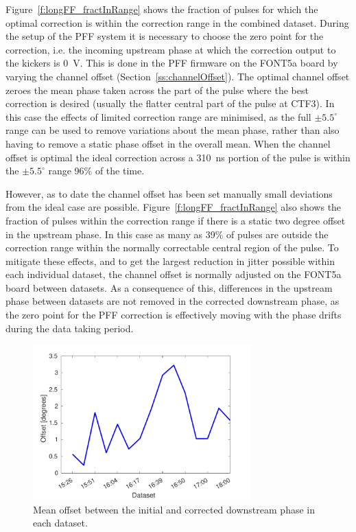 Figure~\ref{f:longFF_fractInRange} shows the fraction of pulses for which the optimal correction is within the correction range in the combined dataset. During the setup of the PFF system it is necessary to choose the zero point for the correction, i.e. the incoming upstream phase at which the correction output to the kickers is 0~V. This is done in the PFF firmware on the FONT5a board by varying the channel offset (Section~\ref{ss:channelOffset}). 
The optimal channel offset zeroes the mean phase taken across the part of the pulse where the best correction is desired (usually the flatter central part of the pulse at CTF3). In this case the effects of limited correction range are minimised, as the full \(\pm5.5^\circ\) range can be used to remove variations about the mean phase, rather than also having to remove a static phase offset in the overall mean. 
When the channel offset is optimal the ideal correction across a 310~ns portion of the pulse is within the \(\pm5.5^\circ\) range 96\% of the time.

However, as to date the channel offset has been set manually small deviations from the ideal case are possible. Figure~\ref{f:longFF_fractInRange} also shows the fraction of pulses within the correction range if there is a static two degree offset in the upstream phase. In this case as many as 39\% of pulses are outside the correction range within the normally correctable central region of the pulse. To mitigate these effects, and to get the largest reduction in jitter possible within each individual dataset, the channel offset is normally adjusted on the FONT5a board between datasets. As a consequence of this, differences in the upstream phase between datasets are not removed in the corrected downstream phase, as the zero point for the PFF correction is effectively moving with the phase drifts during the data taking period. %

\begin{figure}
  \centering
  \includegraphics[width=0.75\textwidth]{Figures/feedforward/longFF_phaseOffset}
  \caption{Mean offset between the initial and corrected downstream phase in each dataset.}
  \label{f:longFF_phaseOffset}
\end{figure}

